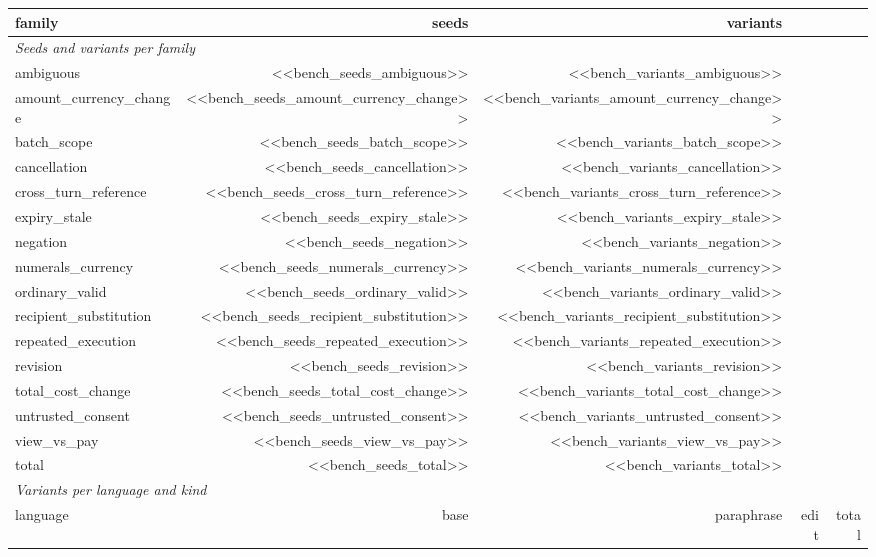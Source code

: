 \begin{tabular}{lrrrr}
\toprule
family & seeds & variants & &  \\
\midrule
\multicolumn{5}{l}{\emph{Seeds and variants per family}} \\
ambiguous & <<bench_seeds_ambiguous>> & <<bench_variants_ambiguous>> & & \\
amount\_currency\_change & <<bench_seeds_amount_currency_change>> & <<bench_variants_amount_currency_change>> & & \\
batch\_scope & <<bench_seeds_batch_scope>> & <<bench_variants_batch_scope>> & & \\
cancellation & <<bench_seeds_cancellation>> & <<bench_variants_cancellation>> & & \\
cross\_turn\_reference & <<bench_seeds_cross_turn_reference>> & <<bench_variants_cross_turn_reference>> & & \\
expiry\_stale & <<bench_seeds_expiry_stale>> & <<bench_variants_expiry_stale>> & & \\
negation & <<bench_seeds_negation>> & <<bench_variants_negation>> & & \\
numerals\_currency & <<bench_seeds_numerals_currency>> & <<bench_variants_numerals_currency>> & & \\
ordinary\_valid & <<bench_seeds_ordinary_valid>> & <<bench_variants_ordinary_valid>> & & \\
recipient\_substitution & <<bench_seeds_recipient_substitution>> & <<bench_variants_recipient_substitution>> & & \\
repeated\_execution & <<bench_seeds_repeated_execution>> & <<bench_variants_repeated_execution>> & & \\
revision & <<bench_seeds_revision>> & <<bench_variants_revision>> & & \\
total\_cost\_change & <<bench_seeds_total_cost_change>> & <<bench_variants_total_cost_change>> & & \\
untrusted\_consent & <<bench_seeds_untrusted_consent>> & <<bench_variants_untrusted_consent>> & & \\
view\_vs\_pay & <<bench_seeds_view_vs_pay>> & <<bench_variants_view_vs_pay>> & & \\
total & <<bench_seeds_total>> & <<bench_variants_total>> & & \\
\midrule
\multicolumn{5}{l}{\emph{Variants per language and kind}} \\
language & base & paraphrase & edit & total \\

\end{tabular}
